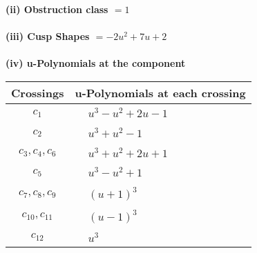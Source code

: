 \documentclass[1p]{elsarticle_modified}
\theoremstyle{definition}
\begin{document}
\flushleft \textbf{(ii) Obstruction class $= 1$}\\~\\
\flushleft \textbf{(iii) Cusp Shapes $= -2 u^2+7 u+2$}\\~\\
\newpage\renewcommand{\arraystretch}{1}
\flushleft \textbf{(iv) u-Polynomials at the component}\newline \\
\begin{tabular}{m{50pt}|m{274pt}}
Crossings & \hspace{64pt}u-Polynomials at each crossing \\
\hline $$\begin{aligned}c_{1}\end{aligned}$$&$\begin{aligned}
&u^3- u^2+2 u-1
\end{aligned}$\\
\hline $$\begin{aligned}c_{2}\end{aligned}$$&$\begin{aligned}
&u^3+u^2-1
\end{aligned}$\\
\hline $$\begin{aligned}c_{3},c_{4},c_{6}\end{aligned}$$&$\begin{aligned}
&u^3+u^2+2 u+1
\end{aligned}$\\
\hline $$\begin{aligned}c_{5}\end{aligned}$$&$\begin{aligned}
&u^3- u^2+1
\end{aligned}$\\
\hline $$\begin{aligned}c_{7},c_{8},c_{9}\end{aligned}$$&$\begin{aligned}
&(u+1)^3
\end{aligned}$\\
\hline $$\begin{aligned}c_{10},c_{11}\end{aligned}$$&$\begin{aligned}
&(u-1)^3
\end{aligned}$\\
\hline $$\begin{aligned}c_{12}\end{aligned}$$&$\begin{aligned}
&u^3
\end{aligned}$\\
\hline
\end{tabular}\\~\\
\end{document}
